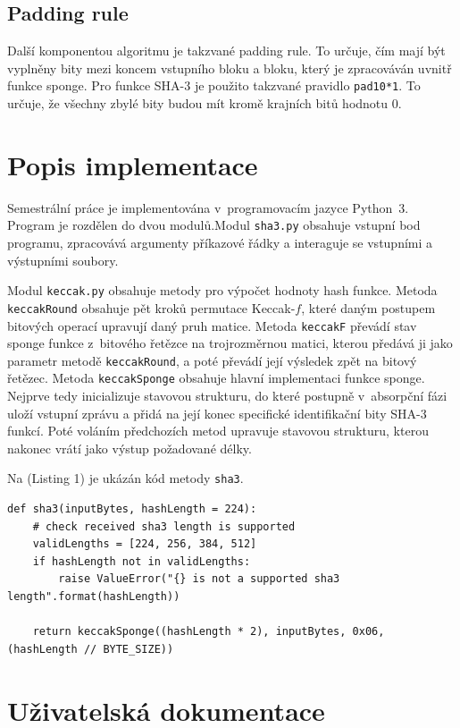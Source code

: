 \documentclass[titlepage,a4paper,12pt]{article}
\begin{document}
\subsection{Padding rule}

Další komponentou algoritmu je takzvané padding rule. To určuje, čím mají být vyplněny bity mezi koncem vstupního bloku a bloku, který je zpracováván uvnitř funkce sponge. Pro funkce SHA-3 je použito takzvané pravidlo \texttt{pad10*1}. To určuje, že všechny zbylé bity budou mít kromě krajních bitů hodnotu 0. 

\section{Popis implementace}

Semestrální práce je implementována v~programovacím jazyce Python~3. Program je rozdělen do dvou modulů.Modul \texttt{sha3.py} obsahuje vstupní bod programu, zpracovává argumenty příkazové řádky a interaguje se vstupními a výstupními soubory. \par
Modul \texttt{keccak.py} obsahuje metody pro výpočet hodnoty hash funkce. Metoda \texttt{keccakRound} obsahuje pět kroků permutace Keccak-\(f\), které daným postupem bitových operací upravují daný pruh matice. Metoda \texttt{keccakF} převádí stav sponge funkce z~bitového řetězce na trojrozměrnou matici, kterou předává ji jako parametr metodě \texttt{keccakRound}, a poté převádí její výsledek zpět na bitový řetězec. Metoda \texttt{keccakSponge} obsahuje hlavní implementaci funkce sponge. Nejprve tedy inicializuje stavovou strukturu, do které postupně v~absorpční fázi uloží vstupní zprávu a přidá na její konec specifické identifikační bity SHA-3 funkcí. Poté voláním předchozích metod upravuje stavovou strukturu, kterou nakonec vrátí jako výstup požadované délky.\par
Na (Listing 1) je ukázán kód metody \texttt{sha3}.

\begin{lstlisting}[caption={Definice metody sha3},captionpos=b]
def sha3(inputBytes, hashLength = 224):
    # check received sha3 length is supported
    validLengths = [224, 256, 384, 512]
    if hashLength not in validLengths:
        raise ValueError("{} is not a supported sha3 length".format(hashLength))
    
    return keccakSponge((hashLength * 2), inputBytes, 0x06, (hashLength // BYTE_SIZE))
\end{lstlisting}

\section{Uživatelská dokumentace}
\end{document}

